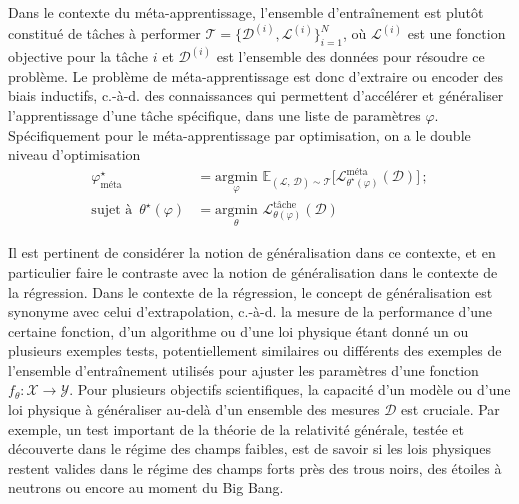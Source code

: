 Dans le contexte du méta-apprentissage, 
l'ensemble d'entraînement est plutôt constitué de tâches à performer $\mathcal{T} = \{\mathcal{D}^{(i)}, \mathcal{L}^{(i)}\}_{i=1}^{N}$, où 
$\mathcal{L}^{(i)}$ est une fonction objective pour la tâche $i$ et $\mathcal{D}^{(i)}$ 
est l'ensemble des données pour résoudre ce problème. 
Le problème de méta-apprentissage est donc d'extraire ou encoder des biais inductifs, c.-à-d. des connaissances qui permettent d'accélérer 
et généraliser l'apprentissage d'une tâche spécifique, dans une liste de paramètres $\varphi$. Spécifiquement 
pour le méta-apprentissage par optimisation, on a le double niveau d'optimisation
\begin{equation}\label{eq:meta learning}
        \begin{aligned}
                \varphi^{\star}_{\text{méta}} &= \underset{\varphi}{\mathrm{argmin}}\,\, 
                \mathbb{E}_{(\mathcal{L},\,\mathcal{D}) \sim \mathcal{T}} \bigg[ \mathcal{L}^{\text{méta}}_{\theta^{\star}(\varphi)}(\mathcal{D}) \bigg]\, ; \\[1.5ex]
                \text{sujet à}\,\,\, \theta^{\star }(\varphi) &= \underset{\theta}{\mathrm{argmin}}\,\, \mathcal{L}^{\text{tâche}}_{\theta(\varphi)}(\mathcal{D})
        \end{aligned}
\end{equation} 

Il est pertinent de considérer la notion de généralisation dans ce contexte, et en particulier faire le contraste avec 
la notion de généralisation dans le contexte de la régression. Dans le contexte de la régression, le concept de généralisation est synonyme 
avec celui d'extrapolation, c.-à-d. la mesure de la performance d'une certaine fonction, d'un algorithme ou d'une loi physique 
étant donné un ou plusieurs exemples tests, 
potentiellement similaires ou différents des exemples de l'ensemble d'entraînement utilisés pour ajuster les paramètres d'une fonction 
$f_\theta: \mathcal{X} \rightarrow \mathcal{Y}$. Pour plusieurs objectifs scientifiques, la capacité d'un modèle ou d'une loi physique  
à généraliser au-delà d'un ensemble des mesures $\mathcal{D}$ est cruciale. 
Par exemple, un test important de la théorie de la relativité générale, testée et découverte dans le régime des champs faibles, est 
de savoir si les lois physiques restent valides dans le régime des champs forts près des trous noirs, des étoiles à neutrons ou encore 
au moment du Big Bang. 

